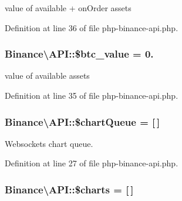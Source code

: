 value of available + on\-Order assets 



Definition at line 36 of file php-\/binance-\/api.\-php.

\hypertarget{classBinance_1_1API_af80ef162a101ffa0963d977126d6811d}{
\subsubsection[{\$btc\-\_\-value}]{\setlength{\rightskip}{0pt plus 5cm}Binance\textbackslash{}\-A\-P\-I\-::\$btc\-\_\-value = 0.}}\label{classBinance_1_1API_af80ef162a101ffa0963d977126d6811d}


value of available assets 



Definition at line 35 of file php-\/binance-\/api.\-php.

\hypertarget{classBinance_1_1API_aaa75d873054290eecf1dd2876237a279}{
\subsubsection[{\$chart\-Queue}]{\setlength{\rightskip}{0pt plus 5cm}Binance\textbackslash{}\-A\-P\-I\-::\$chart\-Queue = \mbox{[}$\,$\mbox{]}\hspace{0.3cm}{\ttfamily [protected]}}}\label{classBinance_1_1API_aaa75d873054290eecf1dd2876237a279}


Websockets chart queue. 



Definition at line 27 of file php-\/binance-\/api.\-php.

\hypertarget{classBinance_1_1API_a0c2d0cd199527b3b275143c49d91702e}{
\subsubsection[{\$charts}]{\setlength{\rightskip}{0pt plus 5cm}Binance\textbackslash{}\-A\-P\-I\-::\$charts = \mbox{[}$\,$\mbox{]}\hspace{0.3cm}{\ttfamily [protected]}}}\label{classBinance_1_1API_a0c2d0cd199527b3b275143c49d91702e}


